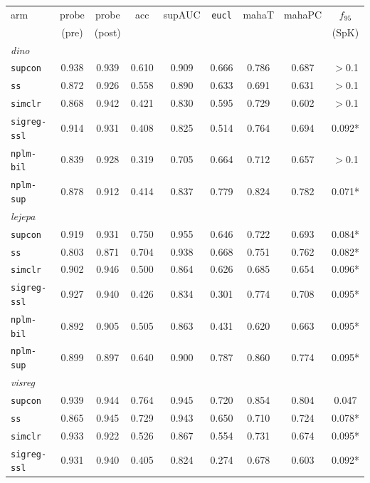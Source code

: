 \documentclass{article}
\begin{document}
\begin{table}[p]\centering\small
\setlength{\tabcolsep}{4pt}
\begin{tabular}{lcccccccc}
\toprule
arm & probe & probe & acc & supAUC & \texttt{eucl} & mahaT & mahaPC & $f_{95}$ \\
    & (pre)  & (post) &     &        &               &       &        & (SpK) \\
\midrule
\multicolumn{9}{l}{\emph{dino}}\\
\texttt{supcon} & 0.938 & 0.939 & 0.610 & 0.909 & 0.666 & 0.786 & 0.687 & $>$0.1 \\
\texttt{ss} & 0.872 & 0.926 & 0.558 & 0.890 & 0.633 & 0.691 & 0.631 & $>$0.1 \\
\texttt{simclr} & 0.868 & 0.942 & 0.421 & 0.830 & 0.595 & 0.729 & 0.602 & $>$0.1 \\
\texttt{sigreg-ssl} & 0.914 & 0.931 & 0.408 & 0.825 & 0.514 & 0.764 & 0.694 & 0.092* \\
\texttt{nplm-bil} & 0.839 & 0.928 & 0.319 & 0.705 & 0.664 & 0.712 & 0.657 & $>$0.1 \\
\texttt{nplm-sup} & 0.878 & 0.912 & 0.414 & 0.837 & 0.779 & 0.824 & 0.782 & 0.071* \\
\multicolumn{9}{l}{\emph{lejepa}}\\
\texttt{supcon} & 0.919 & 0.931 & 0.750 & 0.955 & 0.646 & 0.722 & 0.693 & 0.084* \\
\texttt{ss} & 0.803 & 0.871 & 0.704 & 0.938 & 0.668 & 0.751 & 0.762 & 0.082* \\
\texttt{simclr} & 0.902 & 0.946 & 0.500 & 0.864 & 0.626 & 0.685 & 0.654 & 0.096* \\
\texttt{sigreg-ssl} & 0.927 & 0.940 & 0.426 & 0.834 & 0.301 & 0.774 & 0.708 & 0.095* \\
\texttt{nplm-bil} & 0.892 & 0.905 & 0.505 & 0.863 & 0.431 & 0.620 & 0.663 & 0.095* \\
\texttt{nplm-sup} & 0.899 & 0.897 & 0.640 & 0.900 & 0.787 & 0.860 & 0.774 & 0.095* \\
\multicolumn{9}{l}{\emph{visreg}}\\
\texttt{supcon} & 0.939 & 0.944 & 0.764 & 0.945 & 0.720 & 0.854 & 0.804 & 0.047 \\
\texttt{ss} & 0.865 & 0.945 & 0.729 & 0.943 & 0.650 & 0.710 & 0.724 & 0.078* \\
\texttt{simclr} & 0.933 & 0.922 & 0.526 & 0.867 & 0.554 & 0.731 & 0.674 & 0.095* \\
\texttt{sigreg-ssl} & 0.931 & 0.940 & 0.405 & 0.824 & 0.274 & 0.678 & 0.603 & 0.092* \\

\end{tabular}
\end{table}
\end{document}
